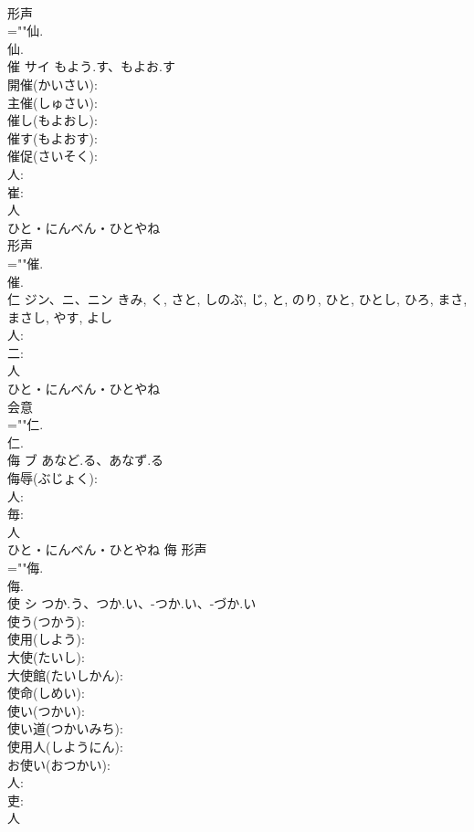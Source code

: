\documentclass[8pt]{extreport}
\begin{document}
\begin{CJK}{UTF8}{min}
\\	形声 
\\	=""仙.
\\	仙.
\\	催	サイ	もよう.す、もよお.す		
\\	開催(かいさい): 
\\	主催(しゅさい): 
\\	催し(もよおし): 
\\	催す(もよおす): 
\\	催促(さいそく): 
\\	人: 
\\	崔: 
\\	人	
\\	ひと・にんべん・ひとやね	
\\	形声 
\\	=""催.
\\	催.
\\	仁	ジン、ニ、ニン		きみ, く, さと, しのぶ, じ, と, のり, ひと, ひとし, ひろ, まさ, まさし, やす, よし	
\\	人: 
\\	二: 
\\	人	
\\	ひと・にんべん・ひとやね	
\\	会意 
\\	=""仁.
\\	仁.
\\	侮	ブ	あなど.る、あなず.る		
\\	侮辱(ぶじょく): 
\\	人: 
\\	毎: 
\\	人	
\\	ひと・にんべん・ひとやね	侮	形声 
\\	=""侮.
\\	侮.
\\	使	シ	つか.う、つか.い、-つか.い、-づか.い		
\\	使う(つかう): 
\\	使用(しよう): 
\\	大使(たいし): 
\\	大使館(たいしかん): 
\\	使命(しめい): 
\\	使い(つかい): 
\\	使い道(つかいみち): 
\\	使用人(しようにん): 
\\	お使い(おつかい): 
\\	人: 
\\	吏: 
\\	人	

\end{CJK}
\end{document}
